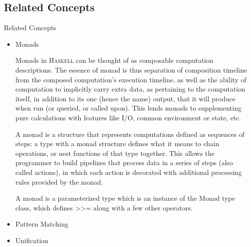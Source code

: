 \documentclass[hideothersubsections, t, aspectratio=1610]{beamer}
\newcommand{\progLang}[1]{\textsc{#1}}
\begin{document}
\subsection{Related Concepts}
\begin{frame}[allowframebreaks]{Related Concepts}
\begin{itemize}
\item Monads

Monads in \progLang{Haskell} can be thought of as composable computation descriptions. The essence of monad is thus separation of 
composition timeline from the composed computation's execution timeline, as well as the ability of computation to implicitly carry extra 
data, as pertaining to the computation itself, in addition to its one (hence the name) output, that it will produce when run (or queried, 
or called upon). This lends monads to supplementing pure calculations with features like I/O, common environment or state, etc. 

A monad is a structure that represents computations defined as sequences of steps: a type with a monad structure defines what it means to 
chain operations, or nest functions of that type together. This allows the programmer to build pipelines that process data in a series of 
steps (also called actions), in which each action is decorated with additional processing rules provided by the monad.

A monad is a parameterized type which is an instance of the Monad type class, which defines >>= along with a few other operators.

\item Pattern Matching

\item Unification
\end{itemize}

\end{frame}

\end{document}
